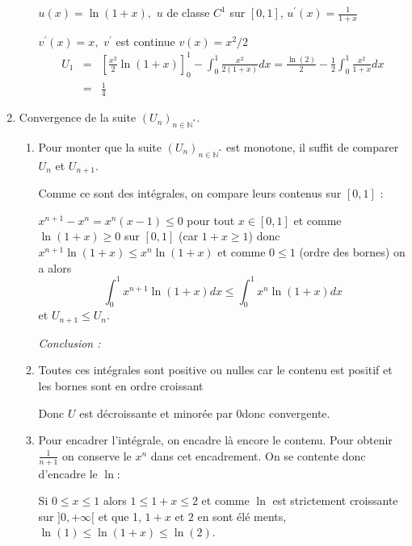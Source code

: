 \begin{correction}
\begin{enumerate}
\begin{enumerate}
$u\left( x\right) =\ln \left( 1+x\right) ,$ $u$ de classe $C^{1}$ sur $\left[
0,1\right] $, $u^{\prime }\left( x\right) =\displaystyle
\frac{1}{1+x}$

$v^{\prime }\left( x\right) =x,$ $v^{\prime }$ est continue $v\left(
x\right) =x^{2}/2$%
\begin{eqnarray*}
U_{1} &=&\left[ \frac{x^{2}}{2}\ln \left( 1+x\right) \right]
_{0}^{1}-\int_{0}^{1}\frac{x^{2}}{2\left( 1+x\right) }dx=\frac{\ln \left(
2\right) }{2}-\frac{1}{2}\int_{0}^{1}\frac{x^{2}}{1+x}dx \\
&=&\frac{1}{4}
\end{eqnarray*}
\end{enumerate}

\item Convergence de la suite $\left( U_{n}\right) _{n\in \mathbb{N}%
^{*}}$.

\begin{enumerate}
\item Pour monter que la suite $\left( U_{n}\right) _{n\in \mathbb{N}^{*}}$
est monotone, il suffit de comparer $U_{n}$ et $U_{n+1}$.

Comme ce sont des int\'{e}grales, on compare leurs contenus sur $\left[ 0,1%
\right] $ :

$x^{n+1}-x^{n}=x^{n}\left( x-1\right) \le 0$ pour tout $x\in \left[ 0,1%
\right] $ et comme $\ln \left( 1+x\right) \ge 0$ sur $\left[ 0,1\right] $
(car $1+x\ge 1$) donc $x^{n+1}\ln \left( 1+x\right) \le x^{n}\ln \left(
1+x\right) $ et comme $0\le 1$ (ordre des bornes) on a alors 
\begin{equation*}
\int_{0}^{1}x^{n+1}\ln \left( 1+x\right) dx\le \int_{0}^{1}x^{n}\ln \left(
1+x\right) dx
\end{equation*}
et $U_{n+1}\le U_{n}.$

\textsl{Conclusion : }

\item Toutes ces int\'{e}grales sont positive ou nulles car le contenu est
positif et les bornes sont en ordre croissant

Donc $U$ est d\'{e}croissante et minor\'{e}e par $0$donc convergente.

\item Pour encadrer l'int\'{e}grale, on encadre l\`{a} encore le contenu.
Pour obtenir $\frac{1}{n+1}$ on conserve le $x^{n}$ dans cet encadrement. On
se contente donc d'encadre le $\ln :$

Si $0\le x\le 1$ alors $1\le 1+x\le 2$ et comme $\ln $ est strictement
croissante sur $]0,+\infty [$ et que 1, $1+x$ et $2$ en sont \'{e}l\'{e}%
ments, $\ln \left( 1\right) \le \ln \left( 1+x\right) \le \ln \left(
2\right) .$


\end{enumerate}
\end{enumerate}
\end{correction}
